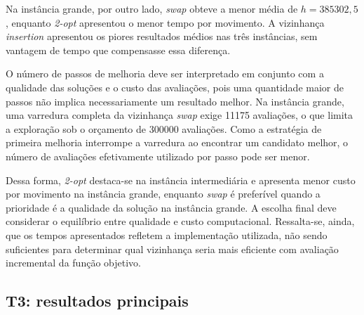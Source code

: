 Na instância grande, por outro lado, \textit{swap} obteve a menor média de \(h=385302,5\), enquanto \textit{2-opt} apresentou o menor tempo por movimento. A vizinhança \textit{insertion} apresentou os piores resultados médios nas três instâncias, sem vantagem de tempo que compensasse essa diferença.

O número de passos de melhoria deve ser interpretado em conjunto com a qualidade das soluções e o custo das avaliações, pois uma quantidade maior de passos não implica necessariamente um resultado melhor. Na instância grande, uma varredura completa da vizinhança \textit{swap} exige 11175 avaliações, o que limita a exploração sob o orçamento de 300000 avaliações. Como a estratégia de primeira melhoria interrompe a varredura ao encontrar um candidato melhor, o número de avaliações efetivamente utilizado por passo pode ser menor.

Dessa forma, \textit{2-opt} destaca-se na instância intermediária e apresenta menor custo por movimento na instância grande, enquanto \textit{swap} é preferível quando a prioridade é a qualidade da solução na instância grande. A escolha final deve considerar o equilíbrio entre qualidade e custo computacional. Ressalta-se, ainda, que os tempos apresentados refletem a implementação utilizada, não sendo suficientes para determinar qual vizinhança seria mais eficiente com avaliação incremental da função objetivo.

\subsection{T3: resultados principais}

